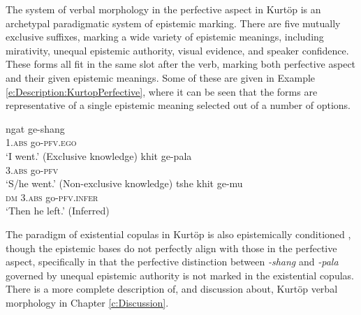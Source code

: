 The system of verbal morphology in the perfective aspect in Kurtöp \cite[East Bodish: Bhutan,][]{Hyslop2018} is an archetypal paradigmatic system of epistemic marking. There are five mutually exclusive suffixes, marking a wide variety of epistemic meanings, including mirativity, unequal epistemic authority, visual evidence, and speaker confidence. These forms all fit in the same slot after the verb, marking both perfective aspect and their given epistemic meanings. Some of these are given in Example \ref{e:Description:KurtopPerfective}, where it can be seen that the forms are representative of a single epistemic meaning selected out of a number of options.

\begin{exe}
        \ex\label{e:Description:KurtopPerfective}
        \begin{xlist}
                \ex 
                \gll ngat ge-shang \\
                1.\textsc{abs} go-\textsc{pfv.ego} \\
                \glt `I went.' (Exclusive knowledge) \cite[130]{Hyslop2018}
                \ex 
                \gll khit ge-pala \\
                3.\textsc{abs} go-\textsc{pfv} \\
                \glt `S/he went.' (Non-exclusive knowledge) \cite[130]{Hyslop2018}
                \ex 
                \gll tshe khit ge-mu \\
                \textsc{dm} 3.\textsc{abs} go-\textsc{pfv.infer} \\
                \glt `Then he left.' (Inferred) \cite[115]{Hyslop2014}
        \end{xlist}
\end{exe}

The paradigm of existential copulas in Kurtöp is also epistemically conditioned \cite{Hyslop2014}, though the epistemic bases do not perfectly align with those in the perfective aspect, specifically in that the perfective distinction between \textit{-shang} and \textit{-pala} governed by unequal epistemic authority is not marked in the existential copulas. There is a more complete description of, and discussion about, Kurtöp verbal morphology in Chapter \ref{c:Discussion}.

